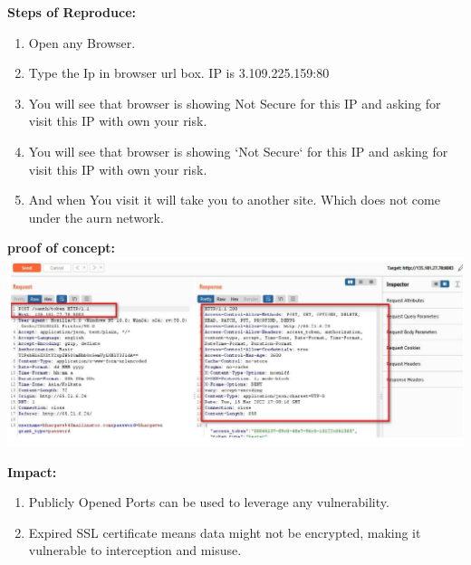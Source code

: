 \documentclass{article}
\begin{document}
\begin{description}[itemsep=2pt, leftmargin=0.2cm]
                    \item \large \textbf{Steps of Reproduce:}
                            \linespread{1.0}
                            \begin{enumerate}[leftmargin=0.5cm]
                             
                             \item \large Open any Browser.

                             \item \large Type the Ip in browser url box. IP is 3.109.225.159:80

                             \item \large You will see that browser is showing Not Secure for this IP and asking for visit this IP with own your risk.

                             \item \large You will see that browser is showing `Not Secure` for this IP and asking for visit this IP with own your risk.

                             \item \large And when You visit it will take you to another site. Which does not come under the aurn network.
                             \end{enumerate}

                    \item \large \textbf{proof of concept: \\ \includegraphics[width=1.0\textwidth]{2.png}} 


                    

                    \item \large \textbf{Impact:}
                            \linespread{1.0}
                            \begin{enumerate}[leftmargin=0.5cm]
                             \item \large Publicly Opened Ports can be used to leverage any vulnerability.
\item \large Expired SSL certificate means data might not be encrypted, making it vulnerable to interception and misuse. 
                            \end{enumerate}  
                            

\end{description}
\end{document}
